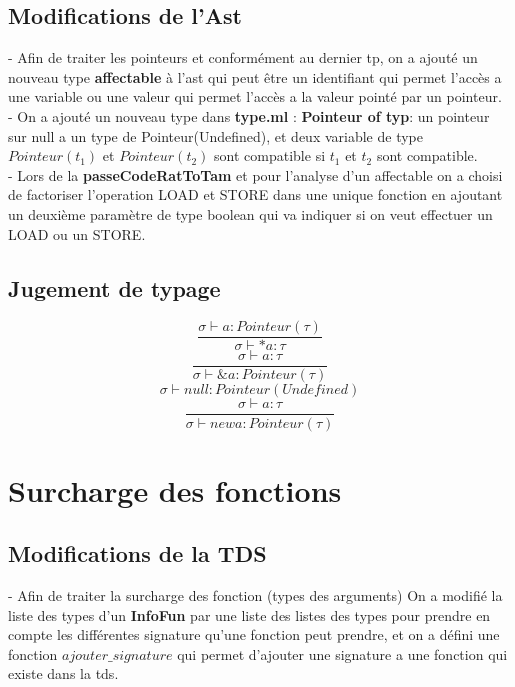 \documentclass{article}
\begin{document}
\subsection{Modifications de l'Ast}
- Afin de traiter les pointeurs et conformément au dernier tp, on a ajouté un nouveau type \textbf{affectable} à l'ast qui peut être un identifiant qui permet l'accès 
a une variable ou une valeur qui permet l'accès a la valeur pointé par un pointeur. \\
- On a ajouté un nouveau type dans \textbf{type.ml} : \textbf{Pointeur of typ}: un pointeur sur null a un type de Pointeur(Undefined), et deux variable de type 
$Pointeur (t_1)$ et $Pointeur (t_2)$ sont compatible si $t_1$ et $t_2$ sont compatible. \\
- Lors de la \textbf{passeCodeRatToTam} et pour l'analyse d'un affectable on a choisi de factoriser l'operation LOAD et STORE dans une unique fonction en 
ajoutant un deuxième paramètre de type boolean qui va indiquer si on veut effectuer un LOAD ou un STORE. \\ 
\subsection{Jugement de typage}
\begin{equation}
    \frac{\sigma \vdash a : Pointeur(\tau)}{\sigma \vdash * a : \tau}
\end{equation}
\begin{equation}
    \frac{\sigma \vdash a :\tau}{\sigma \vdash \& a : Pointeur(\tau)}
\end{equation}
\begin{equation}
    \sigma \vdash null : Pointeur(Undefined)
\end{equation}
\begin{equation}
    \frac{\sigma \vdash a :\tau}{\sigma \vdash new a : Pointeur(\tau)}
\end{equation}
\section{Surcharge des fonctions}
\subsection{Modifications de la TDS}
- Afin de traiter la surcharge des fonction (types des arguments) On a modifié la liste des types d'un \textbf{InfoFun} par une liste des listes des types 
pour prendre en compte les différentes signature qu'une fonction peut prendre, et on a défini une fonction $ajouter\_signature$ qui permet d'ajouter une signature 
a une fonction qui existe dans la tds.
\end{document}

